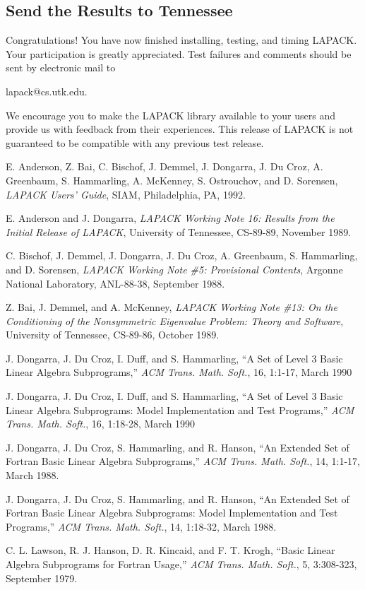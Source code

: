 \subsection{Send the Results to Tennessee}

\dent
Congratulations!  You have now finished installing, testing, and timing
LAPACK.
Your participation is greatly appreciated. 
Test failures and comments should be
sent by electronic mail to 
\begin{list}{}{}
\item lapack@cs.utk.edu.
\end{list}

We encourage you to make the LAPACK library available to your
users and provide us with feedback from their experiences.
This release of LAPACK is not guaranteed to be compatible
with any previous test release.
\newpage
{}

E. Anderson, Z. Bai, C. Bischof, J. Demmel, J. Dongarra,
J. Du Croz, A. Greenbaum, S. Hammarling, A. McKenney,
S. Ostrouchov, and D. Sorensen, 
{\em LAPACK Users' Guide},
{SIAM}, Philadelphia, PA, 1992.

E. Anderson and J. Dongarra,
{\em LAPACK Working Note 16: 
Results from the Initial Release of LAPACK},
University of Tennessee, CS-89-89, November 1989.

C. Bischof, J. Demmel, J. Dongarra, J. Du Croz, A. Greenbaum,
S. Hammarling, and D. Sorensen,
{\em LAPACK Working Note \#5:  Provisional Contents},
Argonne National Laboratory, ANL-88-38, September 1988.

Z. Bai, J. Demmel, and A. McKenney,
{\em LAPACK Working Note \#13: On the Conditioning of the Nonsymmetric
Eigenvalue Problem:  Theory and Software}, 
University of Tennessee, CS-89-86, October 1989.
 
J. Dongarra, J. Du Croz, I. Duff, and S. Hammarling,
``A Set of Level 3 Basic Linear Algebra Subprograms,''
{\em ACM Trans. Math. Soft.}, 16, 1:1-17, March 1990

J. Dongarra, J. Du Croz, I. Duff, and S. Hammarling,
``A Set of Level 3 Basic Linear Algebra Subprograms:
Model Implementation and Test Programs,''
{\em ACM Trans. Math. Soft.}, 16, 1:18-28, March 1990

J. Dongarra, J. Du Croz, S. Hammarling, and R. Hanson,
``An Extended Set of Fortran Basic Linear Algebra Subprograms,''
{\em ACM Trans. Math. Soft.}, 14, 1:1-17, March 1988.

J. Dongarra, J. Du Croz, S. Hammarling, and R. Hanson,
``An Extended Set of Fortran Basic Linear Algebra Subprograms:
Model Implementation and Test Programs,''
{\em ACM Trans. Math. Soft.}, 14, 1:18-32, March 1988.

C. L. Lawson, R. J. Hanson, D. R. Kincaid, and F. T. Krogh,
``Basic Linear Algebra Subprograms for Fortran Usage,''
{\em ACM Trans. Math. Soft.}, 5, 3:308-323, September 1979.

\bibend


